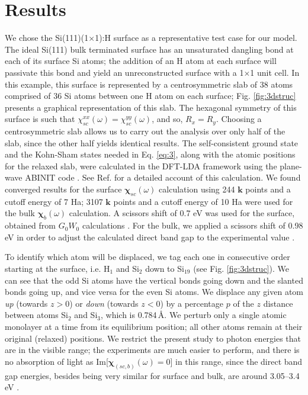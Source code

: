 \documentclass[pss]{wiley2sp} %
\begin{document}

\section{Results}\label{sec:results}

We chose the Si(111)(1$\times$1):H surface as a representative test case for our
model. The ideal Si(111) bulk terminated surface has an unsaturated dangling
bond at each of its surface Si atoms; the addition of an H atom at each surface
will passivate this bond and yield an unreconstructed surface with a 1$\times$1
unit cell. In this example, this surface is represented by a centrosymmetric
slab of 38 atoms comprised of 36 Si atoms between one H atom on each surface;
Fig. \ref{fig:3dstruc} presents a graphical representation of this slab. The
hexagonal symmetry of this surface is such that $\chi^{xx}_{sc}(\omega) =
\chi^{yy}_{sc}(\omega)$, and so, $R_{x} = R_{y}$. Choosing a centrosymmetric
slab allows us to carry out the analysis over only half of the slab, since the
other half yields identical results. The self-consistent ground state and the
Kohn-Sham states needed in Eq. \eqref{eq:3}, along with the atomic positions for
the relaxed slab, were calculated in the DFT-LDA framework using the plane-wave
ABINIT code \cite{gonzeCPS09,abinit}. See Ref. \cite{andersonPRB16b} for a
detailed account of this calculation. We found converged results for the surface
$\boldsymbol{\chi}_{sc}(\omega)$ calculation using 244 $\mathbf{k}$ points and a
cutoff energy of 7 Ha; 3107 $\mathbf{k}$ points and a cutoff energy of 10 Ha
were used for the bulk $\boldsymbol{\chi}^{~}_{b}(\omega)$ calculation.
{\color{red} A scissors shift of 0.7 eV was used for the surface, obtained from
$G_{0}W_{0}$ calculations \cite{liPRB10}. For the bulk, we applied a scissors
shift of 0.98 eV in order to adjust the calculated direct band gap to the
experimental value \cite{landolt}.}

To identify which atom will be displaced, we tag each one in consecutive order
starting at the surface, i.e. H$_{1}$ and Si$_{2}$ down to Si$_{19}$ (see Fig.
\ref{fig:3dstruc}). We can see that the odd Si atoms have the vertical bonds
going down and the slanted bonds going up, and vice versa for the even Si atoms.
We displace any given atom \emph{up} (towards $z > 0$) or \emph{down} (towards
$z < 0$) by a percentage $p$ of the $z$ distance between atoms Si$_{2}$ and
Si$_{3}$, which is 0.784\,\AA. {\color{red}We perturb only a single atomic monolayer at a time} from
its equilibrium position; all other atoms remain at their original (relaxed)
positions. We restrict the present study to photon energies that are in the
visible range; the experiments are much easier to perform, and there is no
absorption of light as Im[$\boldsymbol{\chi}_{(sc,b)}(\omega) = 0$] in this
range, since the direct band gap energies, besides being very similar for
surface and bulk, are around 3.05--3.4\,eV
\cite{landolt,ortegaPRB93,brunevalPRB06,liPRB10}.
\end{document}
